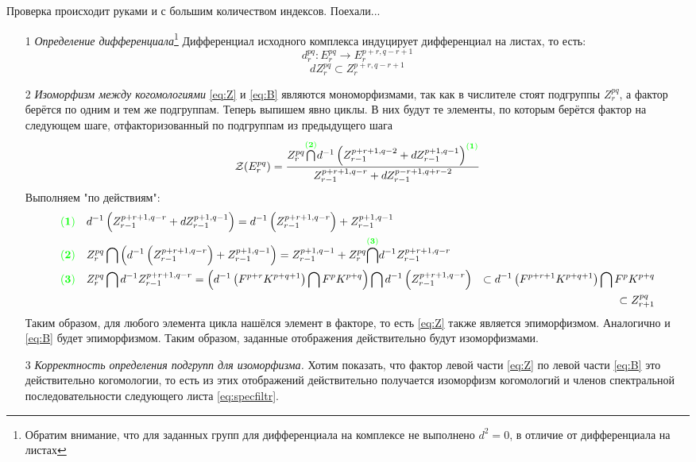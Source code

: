 \documentclass[../main.tex]{subfiles}
\begin{document}
Проверка происходит руками и с большим количеством индексов. Поехали...
\begin{itemize}
\item[1]\textit{Определение дифференциала}\footnote{Обратим внимание, что для заданных групп для дифференциала на комплексе не выполнено $d^2=0$, в отличие от дифференциала на листах }
Дифференциал исходного комплекса индуцирует дифференциал на листах, то есть:
\[d_r^{pq}\colon E_r^{pq} \to E_r^{p+r, q-r+1}\]
\[dZ_r^{pq}\subset Z_r^{p+r, q-r+1}\]
\item[2]\textit{Изоморфизм между когомологиями}
\ref{eq:Z} и \ref{eq:B} являются мономорфизмами, так как в числителе стоят подгруппы $Z^{pq}_r$, а фактор берётся по одним и тем же подгруппам. Теперь выпишем явно циклы. В них будут те элементы, по которым берётся фактор на следующем шаге, отфакторизованный по подгруппам из предыдущего шага 
\[
\mathcal{Z}(E^{pq}_r)=\dfrac{Z_r^{pq}\overset{{\color{green}\mathbf{(2)}}}{\bigcap} d^{-1}\left(Z_{r-1}^{p+r+1, q-2}+dZ_{r-1}^{p+1, q-1}\right)^{\color{green}\mathbf{(1)}}}{Z_{r-1}^{p+r+1, q-r} + dZ_{r-1}^{p-r+1, q+r-2}}
\]
Выполняем "по действиям":
\begin{align*}
{\color{green}\mathbf{(1)}}\quad& d^{-1}\left(Z_{r-1}^{p+r+1, q-r}+dZ_{r-1}^{p+1, q-1}\right) = d^{-1}\left(Z_{r-1}^{p+r+1, q-r}\right)+Z_{r-1}^{p+1, q-1}\\
{\color{green}\mathbf{(2)}} \quad& Z_r^{pq}\bigcap \left(d^{-1}\left(Z_{r-1}^{p+r+1, q-r}\right)+Z_{r-1}^{p+1, q-1}\right) = Z_{r-1}^{p+1, q-1}+Z_r^{pq}\overset{{\color{green}\mathbf{(3)}}}{\bigcap} d^{-1}Z_{r-1}^{p+r+1, q-r}\\
{\color{green}\mathbf{(3)}} \quad&Z_r^{pq}\bigcap d^{-1} Z_{r-1}^{p+r+1, q-r} = \left( d^{-1}\left(F^{p+r}K^{p+q+1}\right)\bigcap F^p K^{p+q} \right)\bigcap d^{-1}\left(Z_{r-1}^{p+r+1, q-r}\right)
  &\subset d^{-1}\left(F^{p+r+1}K^{p+q+1}\right)\bigcap F^pK^{p+q}\\
  &&\subset Z_{r+1}^{pq}
\end{align*}
Таким образом, для любого элемента цикла нашёлся элемент в факторе, то есть \ref{eq:Z} также является эпиморфизмом. Аналогично и \ref{eq:B} будет эпиморфизмом. Таким образом, заданные отображения действительно будут изоморфизмами.
\item[3]\textit{Корректность определения подгрупп для изоморфизма.}
Хотим показать, что фактор левой части \ref{eq:Z} по левой части \ref{eq:B} это действительно когомологии, то есть из этих отображений действительно получается изоморфизм когомологий и членов спектральной последовательности следующего листа \ref{eq:specfiltr}. 

\end{itemize}
\end{document}
